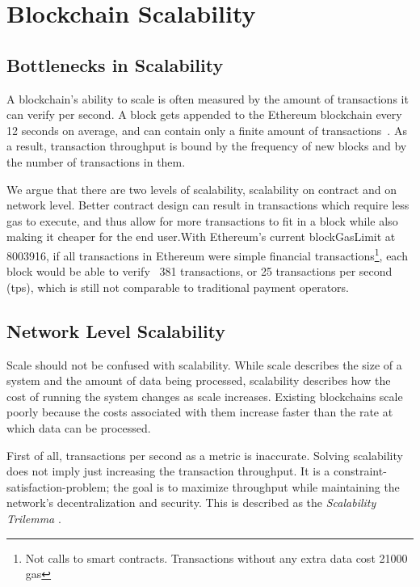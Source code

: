 \chapter{Blockchain Scalability}\label{ch:scalability}

\section{Bottlenecks in Scalability}
A blockchain's ability to scale is often measured by the amount of transactions it can verify per second. A block gets appended to the Ethereum blockchain every 12 seconds on average, and can contain only a finite amount of transactions~\cite{mining}. As a result, transaction throughput is bound by the frequency of new blocks and by the number of transactions in them.

We argue that there are two levels of scalability, scalability on contract and on network level. Better contract design can result in transactions which require less gas to execute, and thus allow for more transactions to fit in a block while also making it cheaper for the end user.With Ethereum's current blockGasLimit at 8003916, if all transactions in Ethereum were simple financial transactions\footnote{Not calls to smart contracts. Transactions without any extra data cost 21000 gas}, each block would be able to verify ~381 transactions, or 25 transactions per second (tps), which is still not comparable to traditional payment operators. 

\section{Network Level Scalability}
Scale should not be confused with scalability. While scale describes the size of a system and the amount of data being processed, scalability describes how the cost of running the system changes as scale increases. Existing blockchains scale poorly because the costs associated with them increase faster than the rate at which data can be processed. 

First of all, transactions per second as a metric is inaccurate. Solving scalability does not imply just increasing the transaction throughput. It is a constraint-satisfaction-problem; the goal is to maximize throughput while maintaining the network's decentralization and security. This is described as the \textit{Scalability Trilemma} \cite{sharding}.

